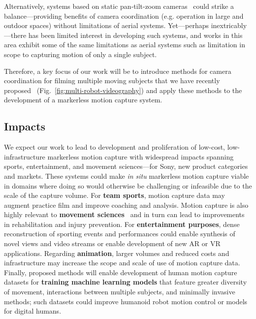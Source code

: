 \documentclass[11pt]{article}
\begin{document}
Alternatively, systems based on static pan-tilt-zoom
cameras~\citep{bachmann20193dv,yamamoto2022visigrapp}
could strike a balance---providing benefits of camera coordination
(e.g. operation in large and outdoor spaces) without limitations of aerial
systems.
Yet---perhaps inextricably---there has been limited interest in developing such
systems, and works in this area exhibit some of the same limitations as aerial
systems such as limitation in scope to capturing motion of only a single
subject.

Therefore, a key focus of our work will be to introduce methods for camera
coordination for filming multiple moving subjects that we have recently
proposed~\citep{hughes2024cdc,suresh2024iros}
(Fig.~\ref{fig:multi-robot-videography}) and apply these methods to the
development of a markerless motion capture system.

\subsection{Impacts}

We expect our work to lead to development and proliferation of
low-cost, low-infrastructure markerless motion capture with widespread
impacts spanning sports, entertainment, and movement sciences---for Sony, new
product categories and markets.
These systems could make \emph{in situ} markerless motion capture viable in
domains where doing so would otherwise be challenging or infeasible due to the
scale of the capture volume.
For \textbf{team sports}, motion capture data may augment practice film and improve
coaching and analysis.
Motion capture is also highly relevant to
\textbf{movement sciences}~\citep{wade2022peerj,nakano2020} and in turn can lead
to improvements in rehabilitation and injury prevention.
For \textbf{entertainment purposes}, dense reconstruction of sporting events
and performances could enable synthesis of novel views and video streams or
enable development of new AR or VR applications.
Regarding \textbf{animation}, larger volumes and reduced costs and
infrastructure may increase the scope and scale of use of motion capture data.
Finally, proposed methods will enable development of human motion capture
datasets for \textbf{training machine learning models} that feature greater
diversity of movement, interactions between multiple subjects, and minimally
invasive methods; such datasets could improve humanoid robot motion control or
models for digital humans.
\end{document}

